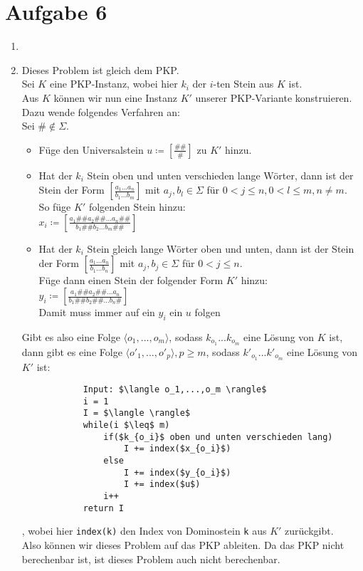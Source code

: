 \documentclass[a4paper,11pt]{scrartcl}
\begin{document}
\newpage
	\section*{Aufgabe 6}
	\begin{enumerate}[label=\alph*)]
	\item	
			
	\item	Dieses Problem ist gleich dem PKP.\\
			Sei $K$ eine PKP-Instanz, wobei hier $k_i$ der $i$-ten Stein aus $K$ ist.\\
			Aus $K$ können wir nun eine Instanz $K'$ unserer PKP-Variante konstruieren. Dazu wende folgendes Verfahren an:\\
			Sei $\# \not\in \Sigma$.
			\begin{itemize}
			\item Füge den Universalstein $u \coloneqq \left[ \frac{\#\#}{\#} \right]$ zu $K'$ hinzu.
			\item Hat der $k_i$ Stein oben und unten verschieden lange Wörter, dann ist der Stein der Form $\left[ \frac{a_1...a_n}{b_1...b_m} \right]$ mit $a_j, b_l \in \Sigma$ für $0<j\leq n, 0<l\leq m, n \neq m$.\\
			      So füge $K'$ folgenden Stein hinzu:\\
			      $x_i \coloneqq \left[ \frac{a_1\#\#a_2\#\#...a_n\#\#}{b_1\#\#b_2...b_m\#\#} \right]$
			\item Hat der $k_i$ Stein gleich lange Wörter oben und unten, dann ist der Stein der Form $\left[ \frac{a_1...a_n}{b_1...b_n} \right]$ mit $a_j, b_j \in \Sigma$ für $0<j\leq n$.\\
				  Füge dann einen Stein der folgender Form $K'$ hinzu:\\
				  $y_i \coloneqq \left[ \frac{a_1\#\#a_2\#\#...a_n}{b_1\#\#b_2\#\#...b_n\#} \right]$\\
				  Damit muss immer auf ein $y_i$ ein $u$ folgen
			\end{itemize}
			Gibt es also eine Folge $\langle o_1,...,o_m \rangle$, sodass $k_{o_1} ... k_{o_m}$ eine Lösung von $K$ ist, dann gibt es eine Folge $\langle o'_1,...,o'_p \rangle , p \geq m$, sodass $k'_{o_1} ... k'_{o_m}$ eine Lösung von $K'$ ist:
			\begin{lstlisting}
			Input: $\langle o_1,...,o_m \rangle$
			i = 1
			I = $\langle \rangle$
			while(i $\leq$ m)
				if($k_{o_i}$ oben und unten verschieden lang)
					I += index($x_{o_i}$)
				else
					I += index($y_{o_i}$)
					I += index($u$)
				i++
			return I
			\end{lstlisting}
			, wobei hier \verb|index(k)| den Index von Dominostein \verb|k| aus $K'$ zurückgibt.\\
			Also können wir dieses Problem auf das PKP ableiten. Da das PKP nicht berechenbar ist, ist dieses Problem auch nicht berechenbar.
	\end{enumerate}
	
\end{document}
